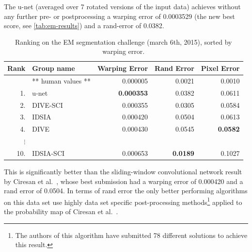 \documentclass{llncs}
\begin{document}
The u-net (averaged over 7 rotated versions of the input data) achieves without any further pre- or postprocessing a warping error of 0.0003529 (the new best score, see \autoref{tab:em-results}) and a rand-error of 0.0382. 

\begin{table}[bp]
  \centering
  \caption{Ranking on the EM segmentation challenge \cite{em-segmentation-webpage} (march 6th, 2015), sorted by warping error.}
  \begin{tabular}{r@{~~~}l@{~~~}r@{~~~}r@{~~~}r}
    \toprule
Rank & Group name &	Warping Error &	Rand Error &	Pixel Error \\ 
\midrule
&** human values ** &	0.000005&	0.0021&	0.0010\\
1. & u-net &	\textbf{0.000353}&	0.0382&	0.0611\\
2. & DIVE-SCI& 	0.000355&	0.0305&	0.0584\\
3. & IDSIA \cite{schmidhuber12deepneural}&	0.000420&	0.0504&	0.0613\\
4. & DIVE &	0.000430&	0.0545&	\textbf{0.0582} \\
$\vdots$\\
10.& IDSIA-SCI& 	0.000653&	\textbf{0.0189}	& 0.1027 \\
\bottomrule
  \end{tabular}
  \label{tab:em-results}
\end{table}

This is significantly better than the sliding-window convolutional network result by Ciresan et al.~\cite{schmidhuber12deepneural}, whose best submission had a warping error of 	0.000420 and a rand error of 0.0504.
In terms of rand error the only better performing algorithms on this data set use highly data set specific post-processing methods\footnote{The authors of this algorithm have submitted 78 different solutions to achieve this result.} applied to the probability map of Ciresan et al.~\cite{schmidhuber12deepneural}.
\end{document}
